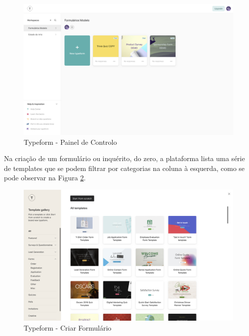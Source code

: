\clearpage

\begin{figure}[ht!]
	\begin{center}
		\includegraphics[width=1\textwidth]{img/tf/tf-dashboard}
		\caption{Typeform - Painel de Controlo}
		\label{fig:tf-dashboard}
	\end{center}
\end{figure}

Na criação de um formulário ou inquérito, do zero, a plataforma lista uma série de templates que se podem filtrar por categorias na coluna à esquerda, como se pode observar na Figura \ref{fig:tf-form-create}.

\begin{figure}[ht!]
	\begin{center}
		\includegraphics[width=1\textwidth]{img/tf/tf-form-create}
		\caption{Typeform - Criar Formulário}
		\label{fig:tf-form-create}
	\end{center}
\end{figure}
\newpage

